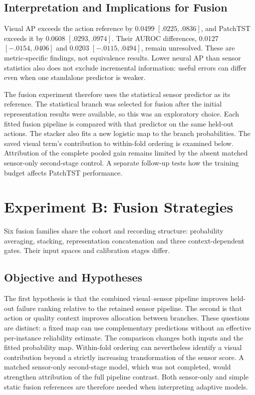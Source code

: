 \subsection{Interpretation and Implications for Fusion}
Visual AP exceeds the action reference by 0.0499 $[.0225,.0836]$, and PatchTST exceeds
it by 0.0608 $[.0293,.0974]$. Their AUROC differences, 0.0127 $[-.0154,.0406]$ and
0.0203 $[-.0115,.0494]$, remain unresolved. These are metric-specific findings, not
equivalence results. Lower neural AP than sensor statistics also does not exclude
incremental information: useful errors can differ even when one standalone predictor is
weaker.

The fusion experiment therefore uses the statistical sensor predictor as its reference.
The statistical branch was selected for fusion after the initial representation results
were available, so this was an exploratory choice.
Each fitted fusion pipeline is compared with that predictor on the same held-out
actions. The stacker also fits a new logistic map to the branch probabilities. The saved
visual term's contribution to within-fold ordering is examined below. Attribution of the
complete pooled gain remains limited by the absent matched sensor-only second-stage
control. A separate follow-up tests how the training budget affects PatchTST
performance.

\section{Experiment B: Fusion Strategies}
Six fusion families share the cohort and recording structure: probability averaging,
stacking, representation concatenation and three context-dependent gates. Their input
spaces and calibration stages differ.

\subsection{Objective and Hypotheses}
The first hypothesis is that the combined visual--sensor pipeline improves held-out
failure ranking relative to the retained sensor pipeline. The second is that action or
quality context improves allocation between branches. These questions are distinct: a
fixed map can use complementary predictions without an effective per-instance
reliability estimate. The comparison changes both inputs and the fitted probability map.
Within-fold ordering can nevertheless identify a visual contribution beyond a strictly
increasing transformation of the sensor score. A matched sensor-only second-stage model,
which was not completed, would strengthen attribution of the full pipeline contrast.
Both sensor-only and simple static fusion references are therefore needed when
interpreting adaptive models.

